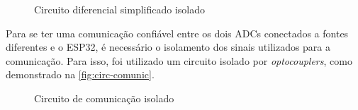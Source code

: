 \begin{figure}[htb!]
    \caption{Circuito diferencial simplificado isolado}
    \vspace*{5mm}
    \label{fig:dif-isolado}
    \fonte{}
\end{figure}

Para se ter uma comunicação confiável entre os dois \gls{ADC}s conectados a fontes diferentes e o ESP32, é necessário o isolamento dos sinais utilizados para a comunicação. Para isso, foi utilizado um circuito isolado por \textit{optocouplers}, como demonstrado na \autoref{fig:circ-comunic}.

\begin{figure}[htb!]
    \caption{Circuito de comunicação isolado}
    \vspace*{5mm}
    \label{fig:circ-comunic}
    \fonte{}
\end{figure}

